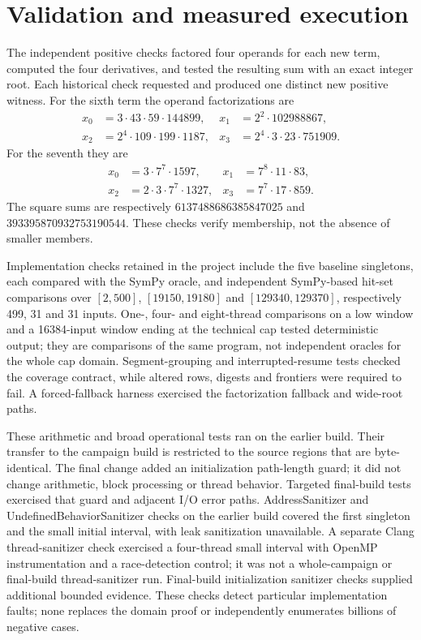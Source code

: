 \documentclass[11pt,a4paper]{article}
\theoremstyle{remark}
\begin{document}
\section{Validation and measured execution}\label{sec:validation}
The independent positive checks factored four operands for each new term,
computed the four derivatives, and tested the resulting sum with an exact
integer root. Each historical check requested and produced one distinct
new positive witness. For the sixth term the operand
factorizations are
\begin{align*}
x_0&=3\cdot43\cdot59\cdot144899,&x_1&=2^2\cdot102988867,\\
x_2&=2^4\cdot109\cdot199\cdot1187,&x_3&=2^4\cdot3\cdot23\cdot751909.
\end{align*}
For the seventh they are
\begin{align*}
x_0&=3\cdot7^7\cdot1597,&x_1&=7^8\cdot11\cdot83,\\
x_2&=2\cdot3\cdot7^7\cdot1327,&x_3&=7^7\cdot17\cdot859.
\end{align*}
The square sums are respectively
$6137488686385847025$ and $393395870932753190544$.
These checks verify membership, not the absence of smaller members.

Implementation checks retained in the project include the five baseline
singletons, each compared with the SymPy oracle, and independent
SymPy-based hit-set comparisons over
$[2,500]$, $[19150,19180]$ and $[129340,129370]$, respectively 499, 31 and
31 inputs. One-, four- and eight-thread comparisons on a low window and a
16384-input window ending at the technical cap tested deterministic output;
they are comparisons of the same program, not independent oracles for the
whole cap domain. Segment-grouping and interrupted-resume tests checked
the coverage contract, while altered rows, digests and frontiers were
required to fail. A forced-fallback harness exercised the factorization
fallback and wide-root paths.

These arithmetic and broad operational tests ran on the earlier build.
Their transfer to the campaign build is restricted to the source regions
that are byte-identical. The final change added an initialization path-length
guard; it did not change arithmetic, block processing or thread behavior.
Targeted final-build tests exercised that guard and adjacent I/O error paths.
AddressSanitizer and UndefinedBehaviorSanitizer checks on the earlier build
covered the first singleton and the small initial interval, with leak
sanitization unavailable. A separate Clang thread-sanitizer check exercised
a four-thread small interval with OpenMP instrumentation and a race-detection
control; it was not a whole-campaign or final-build thread-sanitizer run.
Final-build initialization sanitizer checks supplied additional bounded
evidence. These checks detect particular implementation
faults; none replaces the domain proof or independently enumerates billions
of negative cases.
\end{document}
